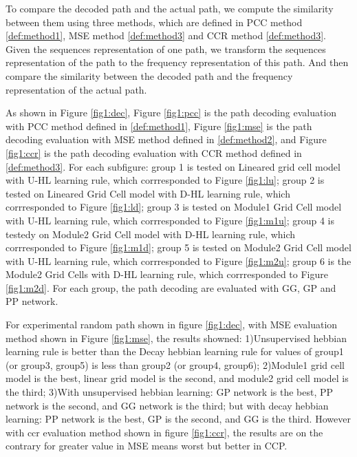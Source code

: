 \documentclass[11pt, letterpaper, onecolumn]{article}
\begin{document}
To compare the decoded path and the actual path, we compute the similarity between them using three methods, which are defined in PCC method \ref{def:method1},  MSE method \ref{def:method3} and CCR method \ref{def:method3}. Given the sequences representation of one path, we transform the sequences representation of the path to the frequency representation of this path. And then compare the similarity between the decoded path and the frequency representation of the actual path.

As shown in Figure \ref{fig1:dec}, Figure \ref{fig1:pcc} is the path decoding evaluation with PCC method defined in \ref{def:method1}, Figure \ref{fig1:mse} is the path decoding evaluation with MSE method defined in \ref{def:method2}, and Figure \ref{fig1:ccr} is the path decoding evaluation with CCR method defined in \ref{def:method3}. For each subfigure: group 1 is tested on Lineared grid cell model with U-HL learning rule, which corrresponded to Figure \ref{fig1:lu}; group 2 is tested on Lineared Grid Cell model with D-HL learning rule, which corrresponded to Figure \ref{fig1:ld}; group 3 is tested on Module1 Grid Cell model with U-HL learning rule, which corrresponded to Figure \ref{fig1:m1u}; group 4 is testedy on Module2 Grid Cell model with D-HL learning rule, which corrresponded to Figure \ref{fig1:m1d}; group 5 is tested on Module2 Grid Cell model with U-HL learning rule, which corrresponded to Figure \ref{fig1:m2u}; group 6 is the Module2 Grid Cells with D-HL learning rule, which corrresponded to Figure \ref{fig1:m2d}. For each group, the path decoding are evaluated with GG, GP and PP network.

For experimental random path shown in figure \ref{fig1:dec}, with MSE evaluation method shown in Figure \ref{fig1:mse}, the results showned: 1)Unsupervised hebbian learning rule is better than the Decay hebbian learning rule for values of group1 (or group3, group5) is less than group2 (or group4, group6); 2)Module1 grid cell model is the best, linear grid model is the second, and module2 grid cell model is the third; 3)With unsupervised hebbian learning: GP network is the best, PP network is the second, and GG network is the third; but with decay hebbian learning: PP network is the best, GP is the second, and GG is the third. However with ccr evaluation method shown in figure \ref{fig1:ccr}, the results are on the contrary for greater value in MSE means worst but better in CCP.
\end{document}
